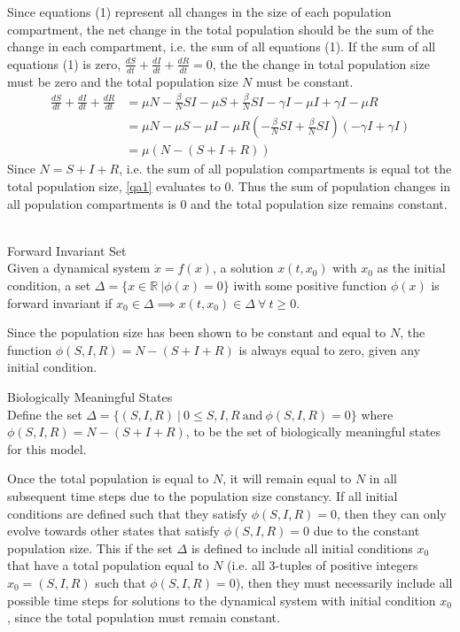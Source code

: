Since equations (1) represent all changes in the size of each population compartment, the net change in the total population should be the sum of the change in each compartment, i.e. the sum of all equations (1).
If the sum of all equations (1) is zero, $\frac{dS}{dt} + \frac{dI}{dt} + \frac{dR}{dt} = 0$, the the change in total population size must be zero and the total population size $N$ must be constant.
\begin{align}
   \frac{dS}{dt} + \frac{dI}{dt} + \frac{dR}{dt} &= \mu N -\frac{\beta}{N} SI - \mu S + \frac{\beta}{N} SI - \gamma I - \mu I + \gamma I - \mu R\\
   &= \mu N - \mu S - \mu I - \mu R (-\frac{\beta}{N} SI + \frac{\beta}{N} SI) (- \gamma I  + \gamma I)\\
   &= \mu (N - (S + I + R)) \label{qa1}
\end{align}
Since $N = S + I + R$, i.e. the sum of all population compartments is equal tot the total population size, \ref{qa1} evaluates to 0.
Thus the sum of population changes in all population compartments is 0 and the total population size remains constant.\\\\
\begin{definition}{Forward Invariant Set\\}
Given a dynamical system $\dot{x}=f(x)$, a solution $x(t,x_0)$ with $x_0$ as the initial condition, a set $\Delta = \{x \in {\mathbb R}\ | \phi(x) = 0 \}$ iwith some positive function $\phi(x)$ is forward invariant if $x_0 \in \Delta \implies x(t,x_0) \in \Delta\ \forall\ t \geq 0$.
\end{definition}
Since the population size has been shown to be constant and equal to $N$, the function $\phi(S,I,R) = N - (S+I+R)$ is always equal to zero, given any initial condition.
\begin{definition}{Biologically Meaningful States\\}
Define the set $\Delta = \{(S,I,R)\ |\ 0 \leq S,I,R \ \textrm{and}\ \phi(S,I,R) = 0\}$ where $\phi(S,I,R) = N - (S+I+R)$, to be the set of biologically meaningful states for this model.
\end{definition}
Once the total population is equal to $N$, it will remain equal to $N$ in all subsequent time steps due to the population size constancy.
If all initial conditions are defined such that they satisfy $\phi(S,I,R) = 0$, then they can only evolve towards other states that satisfy $\phi(S,I,R) = 0$ due to the constant population size.
This if the set $\Delta$ is defined to include all initial conditions $x_0$ that have a total population equal to $N$ (i.e. all 3-tuples of positive integers $x_0 = (S,I,R)$ such that $\phi(S,I,R) = 0$), then they must necessarily include all possible time steps for solutions to the dynamical system with initial condition $x_0$, since the total population must remain constant.
